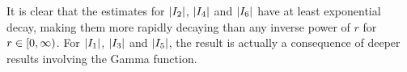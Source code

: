 

It is clear that the estimates for $\left\lvert I_2 \right\rvert$, $\left\lvert I_4 \right\rvert$ and $\left\lvert I_6 \right\rvert$ have at least exponential decay, making them more rapidly decaying than any inverse power of $r$ for $r \in \left[0, \infty\right)$. For $\left\lvert I_1 \right\rvert$, $\left\lvert I_3 \right\rvert$ and $\left\lvert I_5 \right\rvert$, the result is actually a consequence of deeper results involving the Gamma function.

